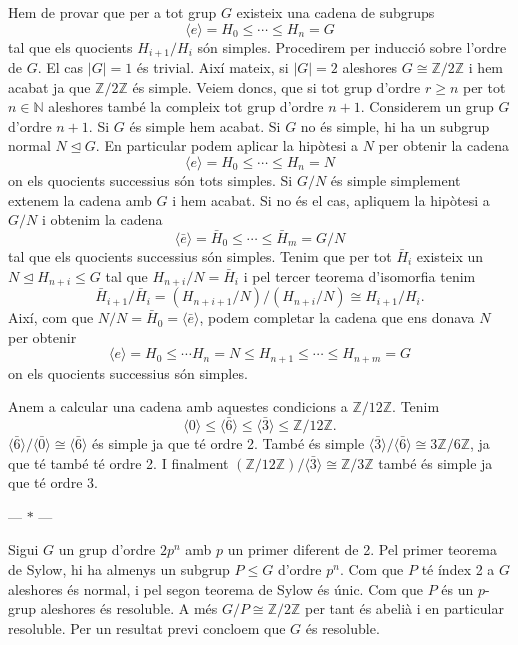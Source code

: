 \documentclass[12pt]{article}
\newcommand{\Z}{\mathbb{Z}}
\newcommand{\N}{\mathbb{N}}
\newcommand{\gen}[1]{\langle #1 \rangle}
\newcommand{\abs}[1]{\left\lvert #1 \right\rvert}
\newcommand{\normal}{\trianglelefteq}
\newcommand{\parbreak}{
	\begin{center}
		--- $\ast$ ---
	\end{center} 
}
\begin{document}
Hem de provar que per a tot grup \( G \) existeix una cadena de subgrups 
\begin{equation*}
	\gen{e} = H_0 \leq \cdots \leq H_n = G
\end{equation*}
tal que els quocients \( H_{i+1}/H_i \) són simples. Procedirem per inducció sobre l'ordre de \( G \). El cas \( \abs{G} = 1 \) és trivial. Així mateix, si \( \abs{G} = 2 \) aleshores \( G \cong \Z/2\Z \) i hem acabat ja que \( \Z/2\Z \) és simple. Veiem doncs, que si tot grup d'ordre  \( r \geq n \) per tot \( n \in \N \) aleshores també la compleix tot grup d'ordre \( n+1 \). Considerem un grup \( G \) d'ordre \( n+1 \). Si \( G \) és simple hem acabat. Si \( G \) no és simple, hi ha un subgrup normal \( N \normal G \). En particular podem aplicar la hipòtesi a \( N \) per obtenir la cadena
\begin{equation*}
	\gen{e} = H_0 \leq \cdots \leq H_n = N
\end{equation*}
on els quocients successius són tots simples. Si \( G/N \) és simple simplement extenem la cadena amb \( G \) i hem acabat. Si no és el cas, apliquem la hipòtesi a \( G/N \) i obtenim la cadena
\begin{equation*}
\gen{\bar{e}} = \bar{H}_0 \leq \cdots \leq \bar{H}_{m} = G/N
\end{equation*}
tal que els quocients successius són simples. Tenim que per tot \( \bar{H}_i \) existeix un	\( N \normal H_{n+i} \leq G \) tal que \( H_{n+i}/N = \bar{H}_i \) i pel tercer teorema d'isomorfia tenim
\begin{equation*}
	\bar{H}_{i+1}/\bar{H}_i = (H_{n+i+1}/N) / (H_{n+i}/N) \cong H_{i+1}/H_i.
\end{equation*}
Així, com que \( N/N = \bar{H}_{0} = \gen{\bar{e}} \), podem completar la cadena que ens donava \( N \) per obtenir
\begin{equation*}
\gen{e} = H_0 \leq \cdots H_n = N \leq H_{n+1} \leq \cdots \leq H_{n+m} = G 
\end{equation*}
on els quocients successius són simples. 

Anem a calcular una cadena amb aquestes condicions a \( \Z/12\Z \). Tenim
\begin{equation*}
\gen{0} \leq \gen{\bar{6}} \leq \gen{\bar{3}} \leq \Z/12\Z. 
\end{equation*}
\( \gen{\bar{6}}/\gen{\bar{0}} \cong \gen{\bar{6}} \) és simple ja que té ordre 2. També és simple \( \gen{\bar{3}} / \gen{\bar{6}} \cong 3\Z/6\Z \), ja que té també té ordre 2. I finalment \( (\Z/12\Z)/\gen{\bar{3}} \cong \Z/3\Z \) també és simple ja que té ordre 3.

\parbreak

Sigui \( G \) un grup d'ordre \( 2p^n \) amb \( p \) un primer diferent de 2. Pel primer teorema de Sylow, hi ha almenys un subgrup \( P \leq G \) d'ordre \( p^n \). Com que \( P \) té índex 2 a \( G \) aleshores és normal, i pel segon teorema de Sylow és únic. Com que \( P \) és un \( p \)-grup aleshores és resoluble. A més \( G/P \cong \Z/2\Z \) per tant és abelià i en particular resoluble. Per un resultat previ concloem que \( G \) és resoluble. 
\end{document}
